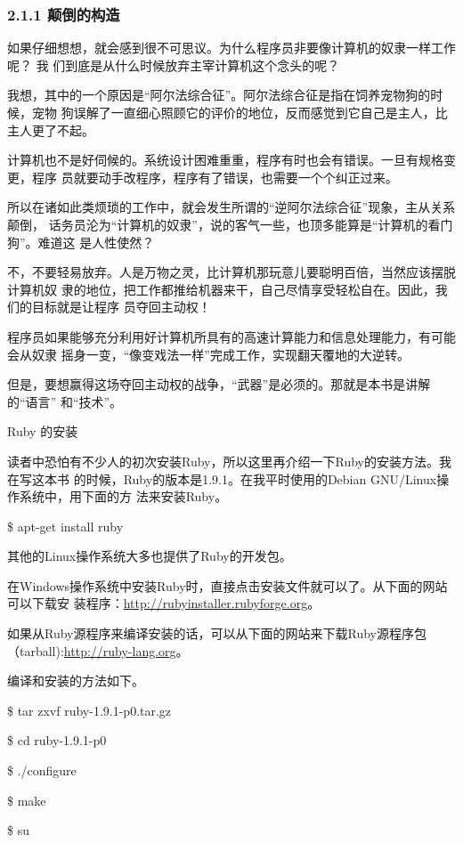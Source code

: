 \documentclass[11pt]{ctexart}
\begin{document}
\subsubsection{2.1.1 颠倒的构造}
\label{sec:orgheadline9}

如果仔细想想，就会感到很不可思议。为什么程序员非要像计算机的奴隶一样工作呢？ 我
们到底是从什么时候放弃主宰计算机这个念头的呢？

我想，其中的一个原因是“阿尔法综合征”。阿尔法综合征是指在饲养宠物狗的时候，宠物
狗误解了一直细心照顾它的评价的地位，反而感觉到它自己是主人，比主人更了不起。

计算机也不是好伺候的。系统设计困难重重，程序有时也会有错误。一旦有规格变更，程序
员就要动手改程序，程序有了错误，也需要一个个纠正过来。

所以在诸如此类烦琐的工作中，就会发生所谓的“逆阿尔法综合征”现象，主从关系颠倒，
话务员沦为“计算机的奴隶”，说的客气一些，也顶多能算是“计算机的看门狗”。难道这
是人性使然？

不，不要轻易放弃。人是万物之灵，比计算机那玩意儿要聪明百倍，当然应该摆脱计算机奴
隶的地位，把工作都推给机器来干，自己尽情享受轻松自在。因此，我们的目标就是让程序
员夺回主动权！

程序员如果能够充分利用好计算机所具有的高速计算能力和信息处理能力，有可能会从奴隶
摇身一变，“像变戏法一样”完成工作，实现翻天覆地的大逆转。

但是，要想赢得这场夺回主动权的战争，“武器”是必须的。那就是本书是讲解的“语言”
和“技术”。

Ruby 的安装

读者中恐怕有不少人的初次安装Ruby，所以这里再介绍一下Ruby的安装方法。我在写这本书
的时候，Ruby的版本是1.9.1。在我平时使用的Debian GNU/Linux操作系统中，用下面的方
法来安装Ruby。

\$ apt-get install ruby

其他的Linux操作系统大多也提供了Ruby的开发包。

在Windows操作系统中安装Ruby时，直接点击安装文件就可以了。从下面的网站可以下载安
装程序：\url{http://rubyinstaller.rubyforge.org}。

如果从Ruby源程序来编译安装的话，可以从下面的网站来下载Ruby源程序包
（tarball):\url{http://ruby-lang.org}。

编译和安装的方法如下。

\$ tar zxvf ruby-1.9.1-p0.tar.gz

\$ cd ruby-1.9.1-p0

\$ ./configure

\$ make

\$ su
\end{document}
